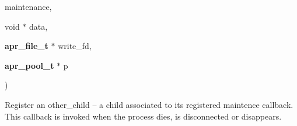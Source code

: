 {\begin{DoxyParamCaption}
\item[{void($\ast$)(int reason,                                                                                                                                                                                                                                                                                                                                                                                                                                                                                                                                                                                                                                                                                                                                                                                                                                                                                                                                                                                                                   void $\ast$,                                                                                                                                                                                                                                                                                                                                                                                                                                                                                                                                                                                                                                                                                                                                                                                                                                                                                                                                                                                                                   int status)}]{maintenance, }
\item[{void $\ast$}]{data, }
\item[{{\bf apr\+\_\+file\+\_\+t} $\ast$}]{write\+\_\+fd, }
\item[{{\bf apr\+\_\+pool\+\_\+t} $\ast$}]{p}
\end{DoxyParamCaption}
)}\hypertarget{group__apr__thread__proc_ga5a9d123afe81eaa97955fbe45704b662}{}\label{group__apr__thread__proc_ga5a9d123afe81eaa97955fbe45704b662}
Register an other\+\_\+child -- a child associated to its registered maintence callback. This callback is invoked when the process dies, is disconnected or disappears. 
